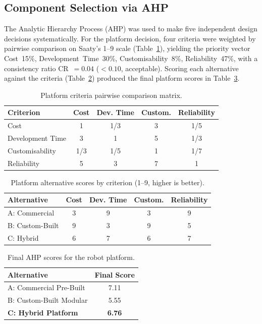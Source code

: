 \documentclass[11pt,a4paper]{article}
\begin{document}
\subsection{Component Selection via AHP}
The Analytic Hierarchy Process (AHP) was used to make five independent design decisions systematically. For the platform decision, four criteria were weighted by pairwise comparison on Saaty's 1--9 scale (Table~\ref{tab:ahp_pairwise}), yielding the priority vector Cost~15\%, Development~Time~30\%, Customisability~8\%, Reliability~47\%, with a consistency ratio CR~$=0.04$ ($<0.10$, acceptable). Scoring each alternative against the criteria (Table~\ref{tab:ahp_scores}) produced the final platform scores in Table~\ref{tab:ahp_final}.

\begin{table}[H]
\centering
\caption{Platform criteria pairwise comparison matrix.}
\label{tab:ahp_pairwise}
\begin{tabular}{lcccc}
\toprule
\textbf{Criterion} & \textbf{Cost} & \textbf{Dev. Time} & \textbf{Custom.} & \textbf{Reliability} \\
\midrule
Cost & 1 & 1/3 & 3 & 1/5 \\
Development Time & 3 & 1 & 5 & 1/3 \\
Customisability & 1/3 & 1/5 & 1 & 1/7 \\
Reliability & 5 & 3 & 7 & 1 \\
\bottomrule
\end{tabular}
\end{table}

\begin{table}[H]
\centering
\caption{Platform alternative scores by criterion (1--9, higher is better).}
\label{tab:ahp_scores}
\begin{tabular}{lcccc}
\toprule
\textbf{Alternative} & \textbf{Cost} & \textbf{Dev. Time} & \textbf{Custom.} & \textbf{Reliability} \\
\midrule
A: Commercial   & 3 & 9 & 3 & 9 \\
B: Custom-Built & 9 & 3 & 9 & 5 \\
C: Hybrid       & 6 & 7 & 6 & 7 \\
\bottomrule
\end{tabular}
\end{table}

\begin{table}[H]
\centering
\caption{Final AHP scores for the robot platform.}
\label{tab:ahp_final}
\begin{tabular}{lc}
\toprule
\textbf{Alternative} & \textbf{Final Score} \\
\midrule
A: Commercial Pre-Built & 7.11 \\
B: Custom-Built Modular & 5.55 \\
\textbf{C: Hybrid Platform} & \textbf{6.76} \\
\bottomrule
\end{tabular}
\end{table}
\end{document}
